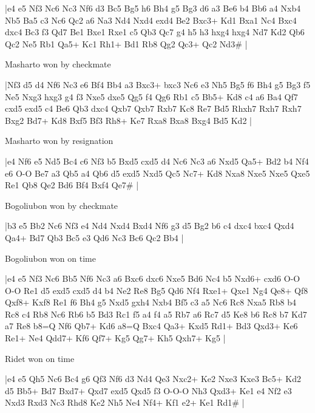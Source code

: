 \makegametitle
|e4 e5 Nf3 Nc6 Nc3 Nf6 d3 Bc5 Bg5 h6 Bh4 g5 Bg3 d6 a3 Be6 b4 Bb6 a4 Nxb4 Nb5 Ba5 c3 Nc6 Qc2 a6 Na3 Nd4 Nxd4 exd4 Be2 Bxc3+ Kd1 Bxa1 Nc4 Bxc4 dxc4 Bc3 f3 Qd7 Be1 Bxe1 Rxe1 c5 Qb3 Qc7 g4 h5 h3 hxg4 hxg4 Nd7 Kd2 Qb6 Qc2 Ne5 Rb1 Qa5+ Kc1 Rh1+ Bd1 Rb8 Qg2 Qc3+ Qc2 Nd3\#  |

\showboard

Masharto won by checkmate

\makegametitle
|Nf3 d5 d4 Nf6 Nc3 e6 Bf4 Bb4 a3 Bxc3+ bxc3 Nc6 e3 Nh5 Bg5 f6 Bh4 g5 Bg3 f5 Ne5 Nxg3 hxg3 g4 f3 Nxe5 dxe5 Qg5 f4 Qg6 Rb1 c5 Bb5+ Kd8 c4 a6 Ba4 Qf7 cxd5 exd5 c4 Be6 Qb3 dxc4 Qxb7 Qxb7 Rxb7 Kc8 Re7 Bd5 Rhxh7 Rxh7 Rxh7 Bxg2 Bd7+ Kd8 Bxf5 Bf3 Rh8+ Ke7 Rxa8 Bxa8 Bxg4 Bd5 Kd2  |

\showboard

Masharto won by resignation

\makegametitle
|e4 Nf6 e5 Nd5 Bc4 c6 Nf3 b5 Bxd5 cxd5 d4 Nc6 Nc3 a6 Nxd5 Qa5+ Bd2 b4 Nf4 e6 O-O Be7 a3 Qb5 a4 Qb6 d5 exd5 Nxd5 Qc5 Nc7+ Kd8 Nxa8 Nxe5 Nxe5 Qxe5 Re1 Qb8 Qe2 Bd6 Bf4 Bxf4 Qe7\#  |

\showboard

Bogoliubon won by checkmate

\makegametitle
|b3 e5 Bb2 Nc6 Nf3 e4 Nd4 Nxd4 Bxd4 Nf6 g3 d5 Bg2 b6 c4 dxc4 bxc4 Qxd4 Qa4+ Bd7 Qb3 Bc5 e3 Qd6 Nc3 Bc6 Qc2 Bb4  |

\showboard

Bogoliubon won on time

\makegametitle
|e4 e5 Nf3 Nc6 Bb5 Nf6 Nc3 a6 Bxc6 dxc6 Nxe5 Bd6 Nc4 b5 Nxd6+ cxd6 O-O O-O Re1 d5 exd5 cxd5 d4 b4 Ne2 Re8 Bg5 Qd6 Nf4 Rxe1+ Qxe1 Ng4 Qe8+ Qf8 Qxf8+ Kxf8 Re1 f6 Bh4 g5 Nxd5 gxh4 Nxb4 Bf5 c3 a5 Nc6 Rc8 Nxa5 Rb8 b4 Rc8 c4 Rb8 Nc6 Rb6 b5 Bd3 Rc1 f5 a4 f4 a5 Rb7 a6 Rc7 d5 Ke8 b6 Rc8 b7 Kd7 a7 Re8 b8=Q Nf6 Qb7+ Kd6 a8=Q Bxc4 Qa3+ Kxd5 Rd1+ Bd3 Qxd3+ Ke6 Re1+ Ne4 Qdd7+ Kf6 Qf7+ Kg5 Qg7+ Kh5 Qxh7+ Kg5  |

\showboard

Ridet won on time

\makegametitle
|e4 e5 Qh5 Nc6 Bc4 g6 Qf3 Nf6 d3 Nd4 Qe3 Nxc2+ Ke2 Nxe3 Kxe3 Bc5+ Kd2 d5 Bb5+ Bd7 Bxd7+ Qxd7 exd5 Qxd5 f3 O-O-O Nh3 Qxd3+ Ke1 e4 Nf2 e3 Nxd3 Rxd3 Nc3 Rhd8 Ke2 Nh5 Ne4 Nf4+ Kf1 e2+ Ke1 Rd1\#  |

